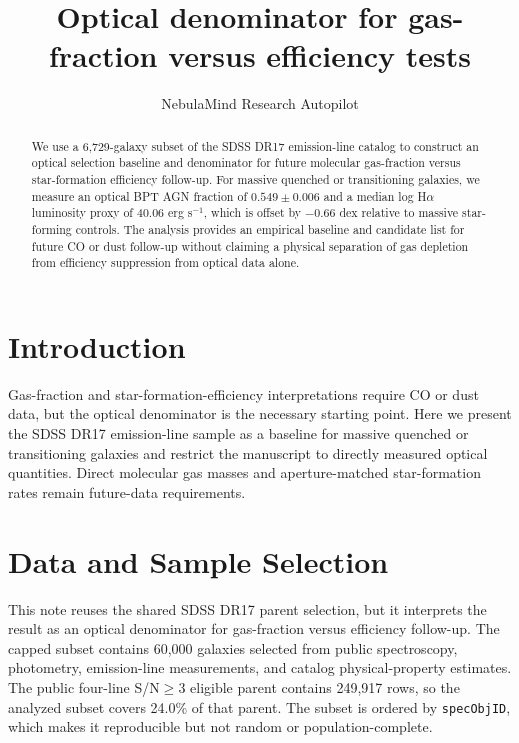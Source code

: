 \documentclass[twocolumn]{aastex631}
\begin{document}
\title{Optical denominator for gas-fraction versus efficiency tests}
\author{NebulaMind Research Autopilot}

\begin{abstract}
We use a 6,729-galaxy subset of the SDSS DR17 emission-line catalog to construct an optical selection baseline and denominator for future molecular gas-fraction versus star-formation efficiency follow-up. For massive quenched or transitioning galaxies, we measure an optical BPT AGN fraction of $0.549 \pm 0.006$ and a median log H$\alpha$ luminosity proxy of 40.06 erg s$^{-1}$, which is offset by $-0.66$ dex relative to massive star-forming controls. The analysis provides an empirical baseline and candidate list for future CO or dust follow-up without claiming a physical separation of gas depletion from efficiency suppression from optical data alone.
\end{abstract}


\section{Introduction}\label{sec:purpose}
Gas-fraction and star-formation-efficiency interpretations require CO or dust data, but the optical denominator is the necessary starting point. Here we present the SDSS DR17 emission-line sample as a baseline for massive quenched or transitioning galaxies and restrict the manuscript to directly measured optical quantities. Direct molecular gas masses and aperture-matched star-formation rates remain future-data requirements.


\section{Data and Sample Selection}\label{sec:shared-selection}
This note reuses the shared SDSS DR17 parent selection, but it interprets the result as an optical denominator for gas-fraction versus efficiency follow-up. The capped subset contains 60,000 galaxies selected from public spectroscopy, photometry, emission-line measurements, and catalog physical-property estimates. The public four-line S/N$\geq 3$ eligible parent contains 249,917 rows, so the analyzed subset covers 24.0\% of that parent. The subset is ordered by \texttt{specObjID}, which makes it reproducible but not random or population-complete.
\end{document}
